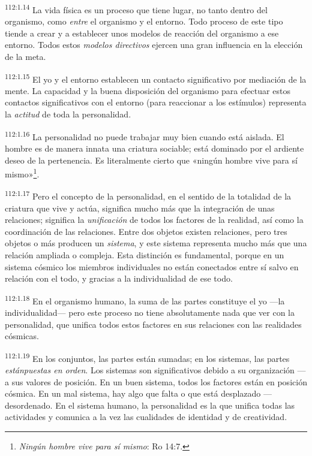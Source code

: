 \par
\textsuperscript{112:1.14} La vida física es un proceso que tiene lugar, no tanto dentro del organismo, como \textit{entre} el organismo y el entorno. Todo proceso de este tipo tiende a crear y a establecer unos modelos de reacción del organismo a ese entorno. Todos estos \textit{modelos directivos} ejercen una gran influencia en la elección de la meta.

\par
\textsuperscript{112:1.15} El yo y el entorno establecen un contacto significativo por mediación de la mente. La capacidad y la buena disposición del organismo para efectuar estos contactos significativos con el entorno (para reaccionar a los estímulos) representa la \textit{actitud} de toda la personalidad.

\par
\textsuperscript{112:1.16} La personalidad no puede trabajar muy bien cuando está aislada. El hombre es de manera innata una criatura sociable; está dominado por el ardiente deseo de la pertenencia. Es literalmente cierto que «ningún hombre vive para sí mismo»\footnote{\textit{Ningún hombre vive para sí mismo}: Ro 14:7.}.

\par
\textsuperscript{112:1.17} Pero el concepto de la personalidad, en el sentido de la totalidad de la criatura que vive y actúa, significa mucho más que la integración de unas relaciones; significa la \textit{unificación} de todos los factores de la realidad, así como la coordinación de las relaciones. Entre dos objetos existen relaciones, pero tres objetos o más producen un \textit{sistema}, y este sistema representa mucho más que una relación ampliada o compleja. Esta distinción es fundamental, porque en un sistema cósmico los miembros individuales no están conectados entre sí salvo en relación con el todo, y gracias a la individualidad de ese todo.

\par
\textsuperscript{112:1.18} En el organismo humano, la suma de las partes constituye el yo ---la individualidad--- pero este proceso no tiene absolutamente nada que ver con la personalidad, que unifica todos estos factores en sus relaciones con las realidades cósmicas.

\par
\textsuperscript{112:1.19} En los conjuntos, las partes están sumadas; en los sistemas, las partes \textit{estánpuestas en orden}. Los sistemas son significativos debido a su organización ---a sus valores de posición. En un buen sistema, todos los factores están en posición cósmica. En un mal sistema, hay algo que falta o que está desplazado ---desordenado. En el sistema humano, la personalidad es la que unifica todas las actividades y comunica a la vez las cualidades de identidad y de creatividad.

